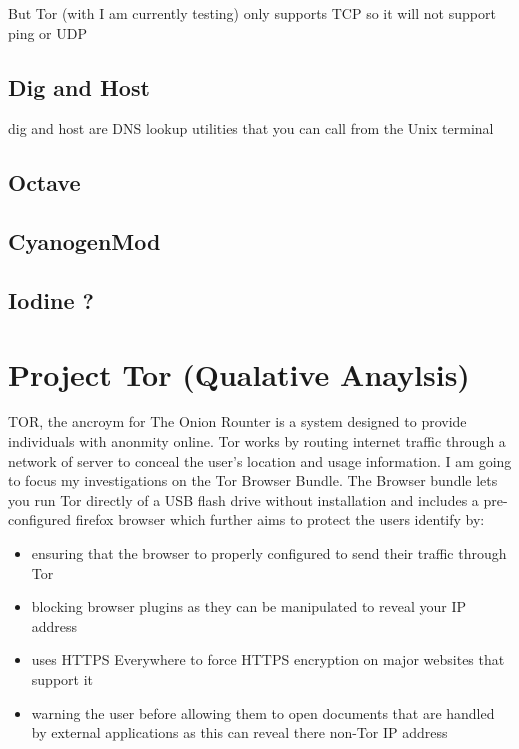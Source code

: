 \documentclass[12pt,a4paper,oneside]{article}
\begin{document}
{But Tor (with I am currently testing) only supports TCP so it will not support ping or UDP


\subsection{Dig and Host}
dig and host are DNS lookup utilities that you can call from the Unix terminal
\subsection{Octave}

\subsection{CyanogenMod}

\subsection{Iodine ?}


\section{Project Tor (Qualative Anaylsis)}

TOR, the ancroym for The Onion Rounter is a system designed to provide individuals with anonmity online. Tor works by routing internet traffic through a network of server to conceal the user's location and usage information. 
I am going to focus my investigations on the Tor Browser Bundle. The Browser bundle lets you run Tor directly of a USB flash drive without installation and includes a pre-configured firefox browser which further aims to protect the users identify by:
\begin{itemize}
\item ensuring that the browser to properly configured to send their traffic through Tor
\item blocking browser plugins as they can be manipulated to reveal your IP address 
\item uses HTTPS Everywhere to force HTTPS encryption on major websites that support it
\item warning the user before allowing them to open documents that are handled by external applications as this can reveal there non-Tor IP address


\end{itemize}}
\end{document}
